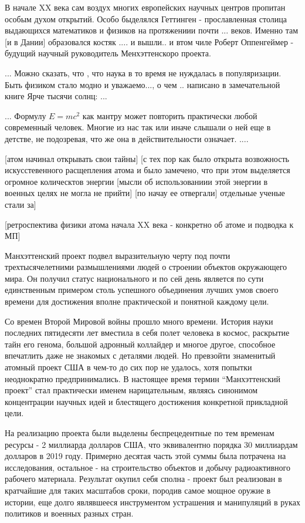 В начале XX века сам воздух многих европейских научных центров пропитан особым духом открытий.
Особо быделялся Геттинген - прославленная столица выдающихся математиков и физиков на протяжениии почти ... веков.
Именно там [и в Дании] образовался костяк .... и вышли.. и втом чиле Роберт Оппенгеймер - будущий научный руководитель Менхэттенскоро проекта.
 

...
Можно сказать, что , что наука в то время не нуждалась в популяризации.
Быть физиком стало модно и уважаемо..., о чем .. написано в замечательной книге Ярче тысячи солнц: ...

...
Формулу $E = mc^2$ как мантру может повторить практически любой современный человек.
Многие из нас так или иначе слышали о ней еще в детстве, не подозревая, что же она в действительности означает.
....

[атом начинал открывать свои тайны]
[с тех пор как было открыта возвожность искусстевенного расщепления атома и было замечено, что при этом выделяется огромное колическтов энергии
[мысли об использованиии этой энергии в военных целях не могла не прийти]
[по начау ее отвергали]
 отдельные ученые стали за]

[ретроспектива физики атома начала XX века - конкретно об атоме и подводка к МП]

Манхэттенский проект подвел выразительную черту под почти трехтысячелетними размышлениями людей о строении объектов окружающего мира.
Он получил статус национального и по сей день является по сути единственным примером столь успешного объединения лучших умов своего времени для достижения вполне практической и понятной каждому цели.

Со времен Второй Мировой войны прошло много времени.
История науки последних пятидесяти лет вместила в себя полет человека в космос, раскрытие тайн его генома, большой адронный коллайдер и многое другое, способное впечатлить даже не знакомых с деталями людей.
Но превзойти знаменитый атомный проект США в чем-то до сих пор не удалось, хотя попытки неоднократно предпринимались.
В настоящее время термин ``Манхэттенский проект'' стал практически именем нарицательным, являясь синонимом концентрации научных идей и блестящего достижения конкретной прикладной цели.

На реализацию проекта были выделены беспрецедентные по тем временам ресурсы - 
2 миллиарда долларов США, что эквивалентно порядка 30 миллиардам долларов в 2019 году. 
Примерно десятая часть этой суммы была потрачена на исследования, остальное - на строительство объектов и добычу радиоактивного рабочего материала.
Результат окупил себя сполна - проект был реализован в кратчайшие для таких масштабов сроки, породив самое мощное оружие в истории, еще долго являвшееся инструментом устрашения и манипуляций в руках политиков и военных разных стран.


